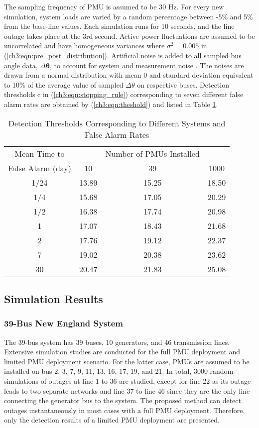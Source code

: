 The sampling frequency of PMU is assumed to be 30 Hz. For every new simulation, system loads are varied by a random percentage between -5\% and 5\% from the base-line values. Each simulation runs for 10 seconds, and the line outage takes place at the 3rd second. Active power fluctuations are assumed to be uncorrelated and have homogeneous variances where $\sigma^2 = 0.005$ in (\ref{ch3:eqn:pre_post_distribution}). Artificial noise is added to all sampled bus angle data, $\Delta \boldsymbol{\theta}$, to account for system and measurement noise \cite{Brown2016}. The noises are drawn from a normal distribution with mean $0$ and standard deviation equivalent to 10\% of the average value of sampled $\Delta{\theta}$ on respective buses. Detection thresholds c in (\ref{ch3:eqn:stopping_rule}) corresponding to seven different false alarm rates are obtained by (\ref{ch3:eqn:theshold}) and listed in Table \ref{ch3:tab:thresholds}. 
\begin{table}[!htpb]
\caption{Detection Thresholds Corresponding to Different Systems and False Alarm Rates}
\label{ch3:tab:thresholds}
\centering
\begin{tabular}{cccc}
\hline
\hline
Mean Time to  && Number of PMUs Installed\\
False Alarm (day) & 10 & 39 & 1000 \\
\hline
1/24 & 13.89 & 15.25 & 18.50 \\
1/4 & 15.68 & 17.05 & 20.29 \\
1/2 & 16.38 & 17.74 & 20.98 \\
1 & 17.07 & 18.43 & 21.68 \\
2 & 17.76 & 19.12 & 22.37 \\
7 & 19.02 & 20.38 & 23.62 \\
30 & 20.47 & 21.83 & 25.08 \\
\hline
\end{tabular} 
\end{table}

\subsection{Simulation Results} 
\subsubsection{39-Bus New England System}
The 39-bus system has 39 buses, 10 generators, and 46 transmission lines. Extensive simulation studies are conducted for the full PMU deployment and limited PMU deployment scenario. For the latter case, PMUs are assumed to be installed on bus 2, 3, 7, 9, 11, 13, 16, 17, 19, and 21. In total, 3000 random simulations of outages at line 1 to 36 are studied, except for line 22 as its outage leads to two separate networks and line 37 to line 46 since they are the only line connecting the generator bus to the system. The proposed method can detect outages instantaneously in most cases with a full PMU deployment. Therefore, only the detection results of a limited PMU deployment are presented. 

